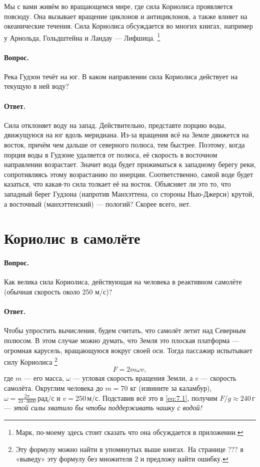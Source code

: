Мы с вами живём во вращающемся мире, где сила Кориолиса проявляется повсюду.
Она вызывает вращение циклонов и антициклонов, а также влияет на океанические течения.
Сила Кориолиса обсуждается во многих книгах, например у \label{Арнольд-Лифшиц} Арнольда, Гольдштейна и Ландау --- Лифшица.%
\footnote{Марк, по-моему здесь стоит сказать что она обсуждается в приложении.}

\paragraph{Вопрос.}\label{Гудзон}
Река Гудзон течёт на юг.
В каком направлении сила Кориолиса действует на текущую в ней воду?

\paragraph{Ответ.}
Сила отклоняет воду на запад.
Действительно, представте порцию воды, движущуюся на юг вдоль меридиана.
Из-за вращения всё на Земле движется на восток, причём чем дальше от северного полюса, тем быстрее.
Поэтому, когда порция воды в Гудзоне удаляется от полюса, её скорость в восточном направлении возрастает.
Значит вода будет прижиматься к западному берегу реки,
сопротивляясь этому возрастанию по инерции.
Соответственно, самой воде будет казаться, что какая-то сила толкает её на восток.
Объясняет ли это то, что западный берег Гудзона (напротив Манхэттена, со стороны Нью-Джерси) крутой, а восточный (манхэттенский) --- пологий?
Скорее всего, нет.

\section{Кориолис в самолёте}\label{Кориолис в самолёте}

\paragraph{Вопрос.}
Как велика сила Кориолиса, действующая на человека в реактивном самолёте (обычная скорость около $250$ м/с)?

\paragraph{Ответ.}
Чтобы упростить вычисления, будем считать, что самолёт летит над Северным полюсом.
В этом случае можно думать, что Земля это плоская платформа --- огромная карусель, вращающуюся вокруг своей оси.
Тогда пассажир испытывает силу Кориолиса%
\footnote{Эту формулу можно найти в упомянутых выше книгах. На странице ??? я «выведу» эту формулу без множителя 2 и предложу найти ошибку.}
\begin{equation}
F = 2 m \omega v,
\label{eq:7.1}
\end{equation}
где $m$ --- его масса,
$\omega$ --- угловая скорость вращения Земли,
а $v$ — скорость самолёта.
Округлим человека до $m = 70$ кг (извините за каламбур),
$\omega = \tfrac{2\pi}{24 \cdot 3600}\,\text{рад/с}$ и
$v = 250 \,\text{м/с}$.
Подставив всё это в \eqref{eq:7.1}, получим
$F/g \approx 240 \,\text{г}$ --- \emph{этой силы хватило бы чтобы поддерживать чашку с водой!}

